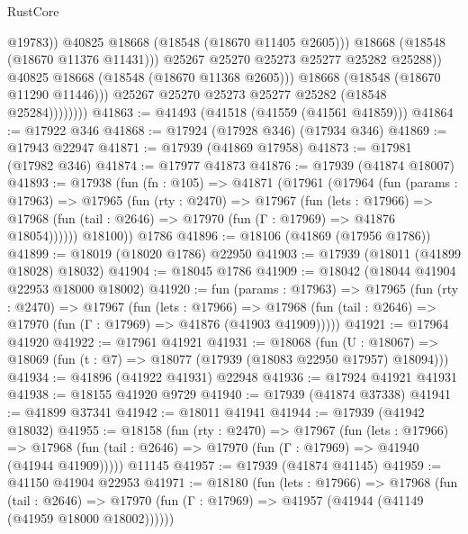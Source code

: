 \begin{lexlean}{RustCore}
\begin{coremodule}
                                  @19783))
                              @40825
                              @18668
                              (@18548 (@18670 @11405 @2605)))
                            @18668
                            (@18548 (@18670 @11376 @11431)))
                          @25267
                          @25270
                          @25273
                          @25277
                          @25282
                          @25288))
                      @40825
                      @18668
                      (@18548 (@18670 @11368 @2605)))
                    @18668
                    (@18548 (@18670 @11290 @11446)))
                  @25267
                  @25270
                  @25273
                  @25277
                  @25282
                  (@18548 @25284))))))))
@41863 := @41493 (@41518 (@41559 (@41561 @41859)))
@41864 := @17922 @346
@41868 := @17924 (@17928 @346) (@17934 @346)
@41869 := @17943 @22947
@41871 := @17939 (@41869 @17958)
@41873 := @17981 (@17982 @346)
@41874 := @17977 @41873
@41876 := @17939 (@41874 @18007)
@41893 := @17938
    (fun (fn : @105) =>
    @41871
      (@17961
        (@17964
          (fun (params : @17963) =>
          @17965
            (fun (rty : @2470) =>
            @17967
              (fun (lets : @17966) =>
              @17968 (fun (tail : @2646) => @17970 (fun (Γ : @17969) => @41876 @18054))))))
        @18100))
    @1786
@41896 := @18106 (@41869 (@17956 @1786))
@41899 := @18019 (@18020 @1786) @22950
@41903 := @17939 (@18011 (@41899 @18028) @18032)
@41904 := @18045 @1786
@41909 := @18042 (@18044 @41904 @22953 @18000 @18002)
@41920 := fun (params : @17963) =>
  @17965
    (fun (rty : @2470) =>
    @17967
      (fun (lets : @17966) =>
      @17968 (fun (tail : @2646) => @17970 (fun (Γ : @17969) => @41876 (@41903 @41909)))))
@41921 := @17964 @41920
@41922 := @17961 @41921
@41931 := @18068
    (fun (U : @18067) => @18069 (fun (t : @7) => @18077 (@17939 (@18083 @22950 @17957) @18094)))
@41934 := @41896 (@41922 @41931) @22948
@41936 := @17924 @41921 @41931
@41938 := @18155 @41920 @9729
@41940 := @17939 (@41874 @37338)
@41941 := @41899 @37341
@41942 := @18011 @41941
@41944 := @17939 (@41942 @18032)
@41955 := @18158
    (fun (rty : @2470) =>
    @17967
      (fun (lets : @17966) =>
      @17968 (fun (tail : @2646) => @17970 (fun (Γ : @17969) => @41940 (@41944 @41909)))))
    @11145
@41957 := @17939 (@41874 @41145)
@41959 := @41150 @41904 @22953
@41971 := @18180
    (fun (lets : @17966) =>
    @17968
      (fun (tail : @2646) =>
      @17970 (fun (Γ : @17969) => @41957 (@41944 (@41149 (@41959 @18000 @18002))))))

\end{coremodule}
\end{lexlean}
